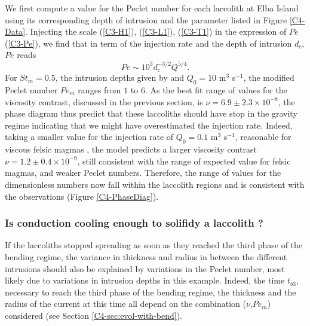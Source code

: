 We first compute  a value for the Peclet number  for each laccolith at
Elba  Island  using  its  corresponding depth  of  intrusion  and  the
parameter  listed  in  Figure   \ref{C4-Data}.   Injecting  the  scale
(\ref{C3-H1}), (\ref{C3-L1}), (\ref{C3-T1}) in  the expression of $Pe$
(\ref{C3-Pe}), we  find that  in term  of the  injection rate  and the
depth of intrusion $d_c$, $Pe$ reads
\begin{equation}
  Pe \sim 10^3 d_c^{-3/2} Q^{5/4}.
\end{equation}
For $St_m  =0.5$, the intrusion depths  given by \citet{Rocchi:2002jy}
and  $Q_0 =10$  m$^{3}$ s$^{-1}$,  the modified  Peclet number  $Pe_m$
ranges from  $1$ to  $6$.  As  the best  fit range  of values  for the
viscosity   contrast,   discussed   in  the   previous   section,   is
$\nu = 6.9\pm 2.3 \times 10^{-8}$, the phase diagram thus predict that
these laccoliths  should have  stop in  the gravity  regime indicating
that we might have overestimated the injection rate.  Indeed, taking a
smaller value  for the injection  rate of $Q_0=0.1$  m$^{3}$ s$^{-1}$,
reasonable for viscous felsic  magmas \citep{Harris:2000jd}, the model
predicts  a larger  viscosity contrast  $\nu=1.2\pm0.4\times 10^{-9}$,
still consistent with  the range of expected value  for felsic magmas,
and  weaker Peclet  numbers. Therefore,  the range  of values  for the
dimensionless numbers  now fall  within the  laccolith regions  and is
consistent with the observations (Figure \ref{C4-PhaseDiag}).

\subsubsection*{Is   conduction   cooling   enough   to   solifidy   a
  laccolith ?}

If the laccoliths stopped spreading as  soon as they reached the third
phase of the  bending regime, the variance in thickness  and radius in
between  the   different  intrusions  should  also   be  explained  by
variations  in the  Peclet number,  most likely  due to  variations in
intrusion  depths  in  this   example.   Indeed,  the  time  $t_{b3}$,
necessary  to  reach  the  third  phase of  the  bending  regime,  the
thickness and the radius of the current at this time all depend on the
combination      ($\nu$,$Pe_m$)      considered      (see      Section
\ref{C4-sec:evol-with-bend}).

